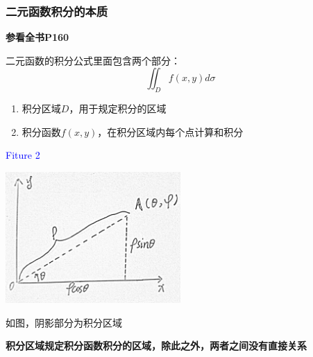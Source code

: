 \documentclass[a4paper]{ctexart}
\begin{document}
\begin{multicols}{2}
\subsubsection{二元函数积分的本质}
\par \textbf{参看全书P160}
\par 二元函数的积分公式里面包含两个部分：
\begin{equation}
\iint_{D}{f(x,y)d\sigma}
\end{equation}
\begin{enumerate}
    \item 积分区域$D$，用于规定积分的区域
    \item 积分函数$f(x,y)$，在积分区域内每个点计算和积分
\end{enumerate}
\textcolor{blue}{Fiture 2}
\begin{center}
\includegraphics[height=5cm]{lecture7/Figure2.jpg}
\end{center}
\par 如图，阴影部分为积分区域
\par \textbf{积分区域规定积分函数积分的区域，除此之外，两者之间没有直接关系}


\end{multicols}
\end{document}
